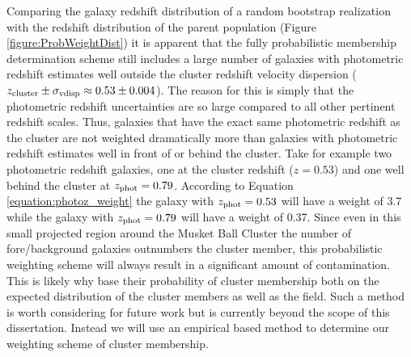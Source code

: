 Comparing the galaxy redshift distribution of a random bootstrap realization with the redshift distribution of the parent population (Figure \ref{figure:ProbWeightDist}) it is apparent that the fully probabilistic membership determination scheme still includes a large number of galaxies with photometric redshift estimates well outside the cluster redshift velocity dispersion ($z_{\rm cluster}\pm\sigma_{\rm vdisp} \approx 0.53\pm0.004$).
The reason for this is simply that the photometric redshift uncertainties are so large compared to all other pertinent redshift scales.
Thus, galaxies that have the exact same photometric redshift as the cluster are not weighted dramatically more than galaxies with photometric redshift estimates well in front of or behind the cluster.
Take for example two photometric redshift galaxies, one at the cluster redshift ($z=0.53$) and one well behind the cluster at $z_{\rm phot}=0.79$.
According to Equation \ref{equation:photoz_weight} the galaxy with $z_{\rm phot}=0.53$ will have a weight of 3.7 while the galaxy with $z_{\rm phot}=0.79$ will have a weight of 0.37.
Since even in this small projected region around the Musket Ball Cluster the number of fore/background galaxies outnumbers the cluster member, this probabilistic weighting scheme will always result in a significant amount of contamination.
This is likely why \citet{George:2011kv} base their probability of cluster membership both on the expected distribution of the cluster members as well as the field.
Such a method is worth considering for future work but is currently beyond the scope of this dissertation.
Instead we will use an empirical based method to determine our weighting scheme of cluster membership. 


